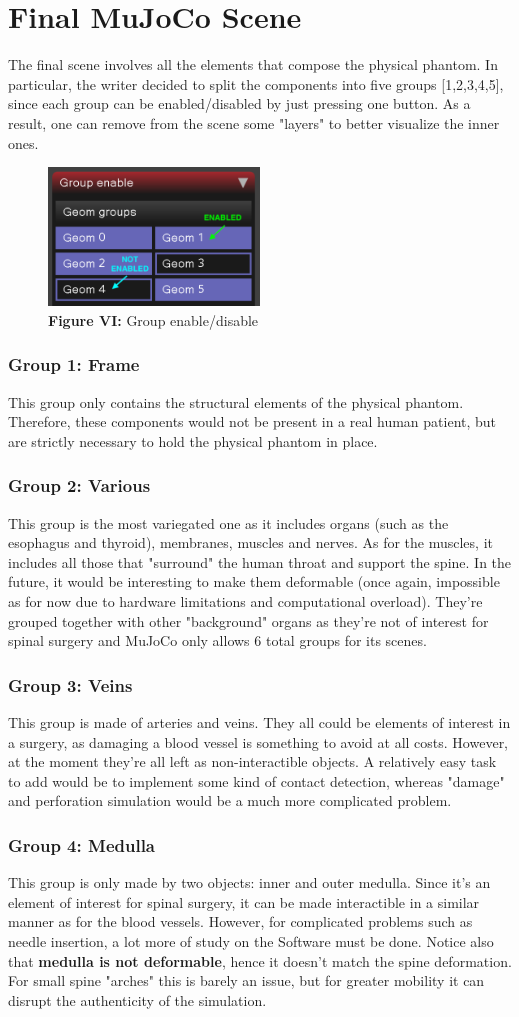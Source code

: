 \documentclass[a4paper, 12pt]{article}
\def\FigureSeven{\centering\includegraphics[width=0.5\textwidth]{Figures/fig07.pdf}}
\begin{document}
\section{Final MuJoCo Scene}
The final scene involves all the elements that compose the physical phantom. 
In particular, the writer decided to split the components into five groups [1,2,3,4,5], since each group can be enabled/disabled by just pressing one button. As a result, one can remove from the scene some "layers" to better visualize the inner ones.
\begin{figure}[h!]
    \FigureSeven
    \caption*{\textbf{Figure VI:} Group enable/disable}
    \label{fig:fig07}
\end{figure}
\subsubsection{Group 1: Frame}
This group only contains the structural elements of the physical phantom. Therefore, these components would not be present in a real human patient, but are strictly necessary to hold the physical phantom in place.
\subsubsection{Group 2: Various}
This group is the most variegated one as it includes organs (such as the esophagus and thyroid), membranes, muscles and nerves.
As for the muscles, it includes all those that "surround" the human throat and support the spine. In the future, it would be interesting to make them deformable (once again, impossible as for now due to hardware limitations and computational overload).
 They're grouped together with other "background" organs as they're not of interest for spinal surgery and MuJoCo only allows 6 total groups for its scenes.
\subsubsection{Group 3: Veins}
This group is made of arteries and veins. They all could be elements of interest in a surgery, as damaging a blood vessel is something to avoid at all costs. However, at the moment they're all left as non-interactible objects. A relatively easy task to add would be to implement some kind of contact detection, whereas "damage" and perforation simulation would be a much more complicated problem.
\subsubsection{Group 4: Medulla}
This group is only made by two objects: inner and outer medulla. Since it's an element of interest for spinal surgery, it can be made interactible in a similar manner as for the blood vessels. However, for complicated problems such as needle insertion, a lot more of study on the Software must be done.
Notice also that \textbf{medulla is not deformable}, hence it doesn't match the spine deformation. For small spine "arches" this is barely an issue, but for greater mobility it can disrupt the authenticity of the simulation.
\end{document}
